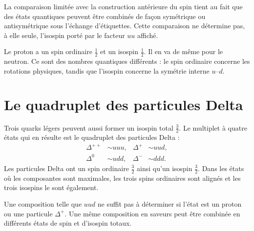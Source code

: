 La comparaison limitée avec la construction antérieure du spin tient au fait que des états quantiques peuvent être combinés de façon symétrique ou antisymétrique sous l’échange d’étiquettes. Cette comparaison ne détermine pas, à elle seule, l’isospin porté par le facteur \(uu\) affiché.

Le proton a un spin ordinaire \(\tfrac12\) et un isospin \(\tfrac12\). Il en va de même pour le neutron. Ce sont des nombres quantiques différents : le spin ordinaire concerne les rotations physiques, tandis que l’isospin concerne la symétrie interne \(u\)--\(d\).

\section{Le quadruplet des particules Delta}

Trois quarks légers peuvent aussi former un isospin total \(\tfrac32\). Le multiplet à quatre états qui en résulte est le quadruplet des particules Delta :
\begin{equation}
\begin{aligned}
\Delta^{++}&\sim uuu,
&
\Delta^{+}&\sim uud,
\\
\Delta^{0}&\sim udd,
&
\Delta^{-}&\sim ddd.
\end{aligned}
\end{equation}
Les particules Delta ont un spin ordinaire \(\tfrac32\) ainsi qu’un isospin \(\tfrac32\). Dans les états où les composantes sont maximales, les trois spins ordinaires sont alignés et les trois isospins le sont également.

Une composition telle que \(uud\) ne suffit pas à déterminer si l’état est un proton ou une particule \(\Delta^+\). Une même composition en saveurs peut être combinée en différents états de spin et d’isospin totaux.

\begin{classroomqa}
\end{classroomqa}

\begin{classroomqa}
\end{classroomqa}

